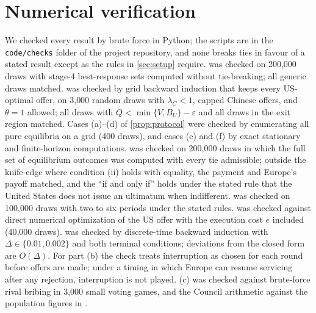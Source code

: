 \section{Numerical verification}\label{app:numerics}

We checked every result by brute force in Python; the scripts are in the \texttt{code/checks} folder of the project repository, and none breaks ties in favour of a stated result except as the rules in \cref{sec:setup} require.  was checked on 200{,}000 draws with stage-4 best-response sets computed without tie-breaking; all generic draws matched.  was checked by grid backward induction that keeps every US-optimal offer, on 3{,}000 random draws with $\lambda_C<1$, capped Chinese offers, and $\theta=1$ allowed; all draws with $Q<\min\{V,B_U\}-\varepsilon$ and all draws in the exit region matched. Cases (a)--(d) of \cref{prop:protocol} were checked by enumerating all pure equilibria on a grid (400 draws), and cases (e) and (f) by exact stationary and finite-horizon computations.  was checked on 200{,}000 draws in which the full set of equilibrium outcomes was computed with every tie admissible; outside the knife-edge where condition (ii) holds with equality, the payment and Europe's payoff matched, and the ``if and only if'' holds under the stated rule that the United States does not issue an ultimatum when indifferent.  was checked on 100{,}000 draws with two to six periods under the stated rules.  was checked against direct numerical optimization of the US offer with the execution cost $e$ included (40{,}000 draws).  was checked by discrete-time backward induction with $\Delta\in\{0.01,0.002\}$ and both terminal conditions; deviations from the closed form are $O(\Delta)$. For part (b) the check treats interruption as chosen for each round before offers are made; under a timing in which Europe can resume servicing after any rejection, interruption is not played. (c) was checked against brute-force rival bribing in 3{,}000 small voting games, and the Council arithmetic against the population figures in \citet{council2025population}.
